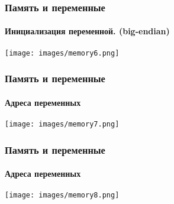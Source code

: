 \documentclass[12pt,pdf,hyperref={unicode}]{beamer}
\begin{document}
\begin{frame}[fragile]
\frametitle{Память и переменные} 
\framesubtitle{Инициализация переменной. (big-endian)} 
\begin{center}
\texttt{[image: images/memory6.png]}
\end{center}
\end{frame}

\begin{frame}[fragile]
\frametitle{Память и переменные} 
\framesubtitle{Адреса переменных} 
\begin{center}
\texttt{[image: images/memory7.png]}
\end{center}
\end{frame}

\begin{frame}[fragile]
\frametitle{Память и переменные} 
\framesubtitle{Адреса переменных} 
\begin{center}
\texttt{[image: images/memory8.png]}
\end{center}
\end{frame}

\iffalse
\begin{frame}
\frametitle{Объявление переменных} 
\begin{center}
\begin{itemize}
\item Переменную нужно объявить перед использованием
\item Примеры объявления:\\
\textcolor{blue}{\textbf{int}} n;\\
\textcolor{blue}{\textbf{float}} p;
\item int -- целочисленный тип \\
\item float -- тип чисел с плавающей точкой
\end{itemize}
\end{center}
\end{frame}

\begin{frame}
\frametitle{Инициализация переменных} 
\begin{center}
\begin{itemize}
\item Переменные инициализируются с помощью оператора присваивания =
\item Примеры:\\
\textcolor{blue}{\textbf{float}} p = 5.4; \\
\textcolor{blue}{\textbf{int}} a = 15, b = 5, c = 9;
\end{itemize}
\end{center}
\end{frame}
\fi
\end{document}
